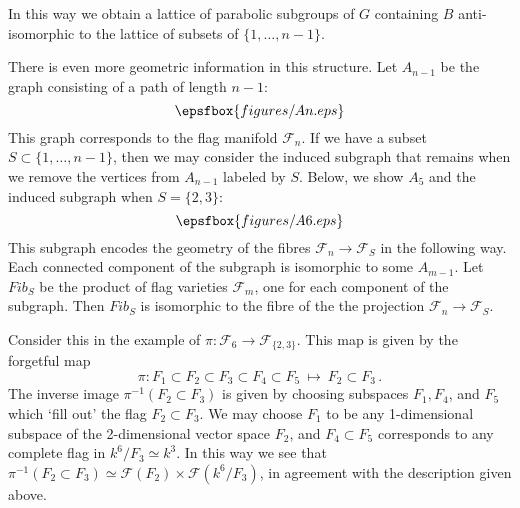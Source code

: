 \documentclass[12pt]{amsart}
\begin{document}
In this way we obtain a lattice of parabolic subgroups of $G$ containing $B$
anti-isomorphic to the lattice of subsets of $\{1,\ldots,n-1\}$.

There is even more geometric information in this structure.
Let $A_{n-1}$ be the graph consisting of a path of length $n-1$:
$$
  \epsfbox{figures/An.eps}
$$
This graph corresponds to the flag manifold ${\mathcal F}_n$.
If we have a subset $S\subset \{1,\ldots,n-1\}$, then we may consider the 
induced subgraph that remains when we remove the vertices from $A_{n-1}$
labeled by $S$. 
Below, we show $A_5$ and the induced subgraph when $S=\{2,3\}$:
$$
  \epsfbox{figures/A6.eps}
$$
This subgraph encodes the geometry of the fibres 
${\mathcal F}_n\to{\mathcal F}_S$ in the following way.
Each connected component of the subgraph is isomorphic to some $A_{m-1}$.
Let $Fib_S$ be the product of flag varieties ${\mathcal F}_m$, one for each
component of the subgraph.
Then $Fib_S$ is isomorphic to the fibre of the the projection
${\mathcal F}_n\to{\mathcal F}_S$.

Consider this in the example of 
$\pi\colon{\mathcal F}_6\to {\mathcal F}_{\{2,3\}}$.
This map is given by the forgetful map
$$
  \pi\colon
  F_1\subset F_2\subset F_3\subset F_4\subset F_5\ \longmapsto\ 
  F_2\subset F_3\,.
$$
The inverse image $\pi^{-1}(F_2\subset F_3)$ is given by choosing
subspaces $F_1,F_4$, and $F_5$ which `fill out' the flag 
$F_2\subset F_3$.
We may choose $F_1$ to be any 1-dimensional subspace of the 2-dimensional
vector space $F_2$, and $F_4\subset F_5$ corresponds to any complete flag in 
$k^6/F_3\simeq k^3$.
In this way we see that 
$\pi^{-1}(F_2\subset F_3)\simeq 
   {\mathcal F}(F_2)\times {\mathcal F}(k^6/F_3)$, in agreement with the
description given above.
\end{document}
